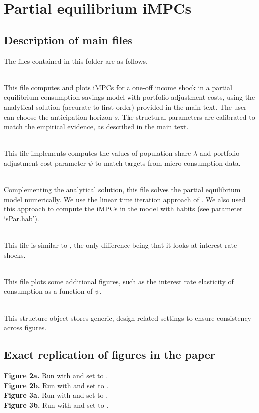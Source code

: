 \documentclass[12pt]{article}
\theoremstyle{plain}
\begin{document}
\section{Partial equilibrium iMPCs}
\subsection{Description of main files}
The files contained in this folder are as follows.

 \\
This file computes and plots iMPCs for a one-off income shock in a partial equilibrium consumption-savings model with portfolio adjustment costs, using the analytical solution (accurate to first-order) provided in the main text. The user can choose the anticipation horizon $s$. The structural parameters are calibrated to match the empirical evidence, as described in the main text.

\\
This file implements computes the values of population share $\lambda$ and portfolio adjustment cost parameter $\psi$ to match targets from micro consumption data.

\\
Complementing the analytical solution, this file solves the partial equilibrium model numerically. We use the linear time iteration approach of \citet{rendahlLinearTimeIteration2017a}. We also used this approach to compute the iMPCs in the model with habits (see parameter `sPar.hab').

\\
This file is similar to , the only difference being that it looks at interest rate shocks.

\\
This file plots some additional figures, such as the interest rate elasticity of consumption as a function of $\psi$.

\\
This structure object stores generic, design-related settings to ensure consistency across figures.

\subsection{Exact replication of figures in the paper}
\textbf{Figure 2a.} Run  with  and  set to . \\
\textbf{Figure 2b.} Run  with  and  set to . \\
\textbf{Figure 3a.} Run  with  and  set to . \\
\textbf{Figure 3b.} Run  with  and  set to . 
\end{document}
